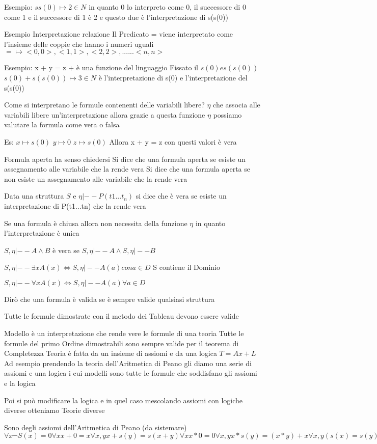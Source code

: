 Esempio:
$s s(0) \mapsto 2 \in N$ in quanto 0 lo interpreto come 0, il successore di 0 come 1 e il successore di 1 è 2 e questo due è l'interpretazione di s(s(0))

Esempio Interpretazione relazione
Il Predicato = viene interpretato come l'insieme delle coppie che hanno i numeri uguali
$= \mapsto <0,0>,<1,1>,<2,2>,......<n,n>$

Esempio: 
x + y = z    + è una funzione del linguaggio
Fissato il $s(0) e s(s(0))$
$s(0) + s(s(0)) \mapsto 3 \in N$ è l'interpretazione di s(0) e l'interpretazione del s(s(0))

Come si interpretano le formule contenenti delle variabili libere?
$\eta$ che associa alle variabili libere un'interpretazione  allora grazie a questa funzione $\eta$ possiamo valutare la formula come vera o falsa

Es:
$x \mapsto s(0)$
$y \mapsto 0$
$z \mapsto s(0)$
Allora x + y = z con questi valori è vera

Formula aperta ha senso chiedersi 
Si dice che una formula aperta    se esiste un assegnamento alle variabile che la rende vera
Si dice che una formula aperta se non esiste un assegnamento alle variabile che la rende vera

Data una struttura $S $ e $\eta |-- P(t1...t_n)$ si dice che è vera se esiste un interpretazione di P(t1...tn) che la rende vera

Se una formula è chiusa allora non necessita della funzione $\eta$ in quanto l'interpretazione è unica

$S,\eta |-- A \land B$ è vera se $S,\eta |-- A \land S,\eta |-- B$

$S,\eta |-- \exists x A(x) \iff S,\eta |-- A(a) con a \in D$  S contiene il Dominio

$S,\eta |-- \forall x A(x) \iff S,\eta |-- A(a) \forall a \in D$

Dirò che una formula è valida se è sempre valide qualsiasi struttura

Tutte le formule dimostrate con il metodo dei Tableau devono essere valide

Modello è un interpretazione che rende vere le formule di una teoria
Tutte le formule del primo Ordine dimostrabili sono sempre valide per il teorema di Completezza
Teoria è fatta da un insieme di assiomi e da una logica $T = Ax + L$
Ad esempio prendendo la teoria dell'Aritmetica di Peano gli diamo una serie di assiomi e una logica 
i cui modelli sono tutte le formule che soddisfano gli assiomi e la logica

Poi si può modificare la logica e in quel caso mescolando assiomi con logiche diverse otteniamo Teorie diverse

Sono degli assiomi dell'Aritmetica di Peano (da sistemare)
$\forall x \neg S(x) = 0
\forall x x + 0 = x
\forall x,y x + s(y) = s(x + y)
\forall x x * 0 = 0
\forall x,y x * s(y) = (x * y) + x 
\forall x,y (s(x) = s(y)) \rightarrow x = y
P(0)
\neg D(0)
\forall x (P(x) \rightarrow \neg P(s(x))) P indica i numeri Pari
\forall x (D(x) \rightarrow \neg D(S(x))) D indica i numeri Dispari $

